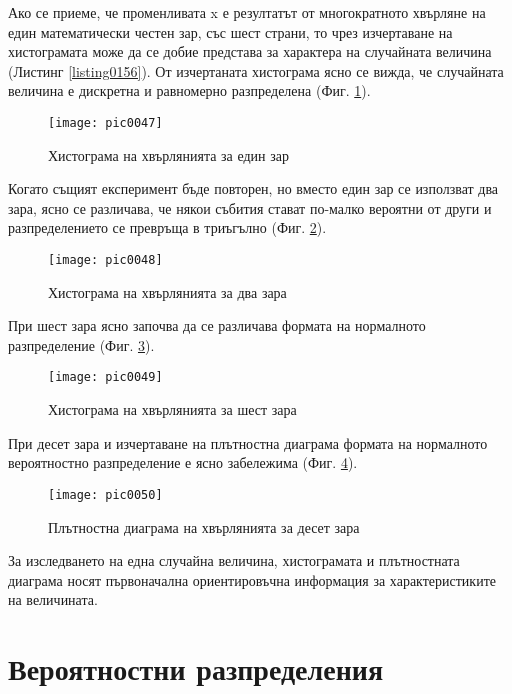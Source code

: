 Ако се приеме, че променливата x е резултатът от многократното хвърляне на един математически честен зар, със шест страни, то чрез изчертаване на хистограмата може да се добие представа за характера на случайната величина (Листинг \ref{listing0156}). От изчертаната хистограма ясно се вижда, че случайната величина е дискретна и равномерно разпределена (Фиг. \ref{figure0047}).

\begin{figure}[h!]
  \centering
  \texttt{[image: pic0047]}
  \caption{Хистограма на хвърлянията за един зар}
\label{figure0047}
\end{figure}
\FloatBarrier

Когато същият експеримент бъде повторен, но вместо един зар се използват два зара, ясно се различава, че някои събития стават по-малко вероятни от други и разпределението се превръща в триъгълно (Фиг. \ref{figure0048}).

\begin{figure}[h!]
  \centering
  \texttt{[image: pic0048]}
  \caption{Хистограма на хвърлянията за два зара}
\label{figure0048}
\end{figure}
\FloatBarrier

При шест зара ясно започва да се различава формата на нормалното разпределение (Фиг. \ref{figure0049}).

\begin{figure}[h!]
  \centering
  \texttt{[image: pic0049]}
  \caption{Хистограма на хвърлянията за шест зара}
\label{figure0049}
\end{figure}
\FloatBarrier

При десет зара и изчертаване на плътностна диаграма формата на нормалното вероятностно разпределение е ясно забележима (Фиг. \ref{figure0050}).

\begin{figure}[h!]
  \centering
  \texttt{[image: pic0050]}
  \caption{Плътностна диаграма на хвърлянията за десет зара}
\label{figure0050}
\end{figure}
\FloatBarrier

За изследването на една случайна величина, хистограмата и плътностната диаграма носят първоначална ориентировъчна информация за характеристиките на величината.

\section{Вероятностни разпределения}

